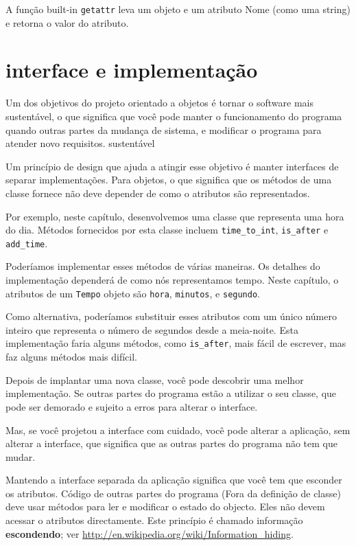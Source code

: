 \documentclass[10pt]{book}
\begin{document}
\begin{exercise}
\begin{v erbatim}
A função built-in {\tt getattr} leva um objeto e um atributo
Nome (como uma string) e retorna o valor do atributo.


\section{interface e implementação}

Um dos objetivos do projeto orientado a objetos é tornar o software mais
sustentável, o que significa que você pode manter o funcionamento do programa quando
outras partes da mudança de sistema, e modificar o programa para atender novo
requisitos.
\index{} sustentável

Um princípio de design que ajuda a atingir esse objetivo é manter
interfaces de separar implementações. Para objetos, o que significa
que os métodos de uma classe fornece não deve depender de como o
atributos são representados.

Por exemplo, neste capítulo, desenvolvemos uma classe que representa
uma hora do dia. Métodos fornecidos por esta classe incluem
\Verb "time_to_int", \verb "is_after" e \verb "add_time".

Poderíamos implementar esses métodos de várias maneiras. Os detalhes do
implementação dependerá de como nós representamos tempo. Neste capítulo, o
atributos de um {\tt Tempo} objeto são {\tt hora}, {\tt minutos}, e
{\tt segundo}.

Como alternativa, poderíamos substituir esses atributos com
um único número inteiro que representa o número de segundos
desde a meia-noite. Esta implementação faria alguns métodos,
como \verb "is_after", mais fácil de escrever, mas faz alguns métodos
mais difícil.

Depois de implantar uma nova classe, você pode descobrir uma melhor
implementação. Se outras partes do programa estão a utilizar o seu
classe, que pode ser demorado e sujeito a erros para alterar o
interface.  

Mas, se você projetou a interface com cuidado, você pode
alterar a aplicação, sem alterar a interface, que
significa que as outras partes do programa não tem que mudar.

Mantendo a interface separada da aplicação significa que
você tem que esconder os atributos. Código de outras partes do programa
(Fora da definição de classe) deve usar métodos para ler
e modificar o estado do objecto. Eles não devem acessar o
atributos directamente. Este princípio é chamado {informação \bf escondendo};
ver \url{http://en.wikipedia.org/wiki/Information_hiding}.


\end{v erbatim}
\end{exercise}
\end{document}
